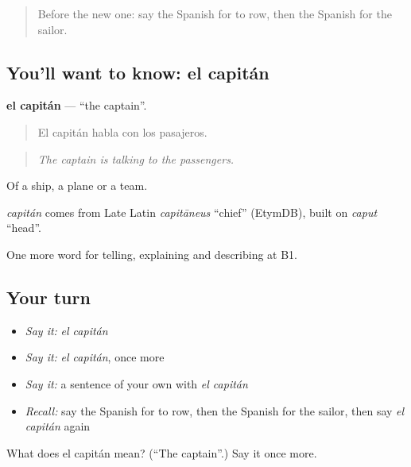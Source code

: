\label{lesson:ES-C659-capitan}



\begin{quote}
Before the new one: say the Spanish for to row, then the Spanish for the sailor.
\end{quote}

\subsection*{You'll want to know: el capitán}
\textbf{el capitán} — \textquotedblleft{}the captain\textquotedblright{}.

\begin{quote}
El capitán habla con los pasajeros.
\end{quote}

\begin{quote}
\emph{The captain is talking to the passengers.}
\end{quote}

Of a ship, a plane or a team.

\begin{cousinweb}
\emph{capitán} comes from Late Latin \emph{capitāneus} \textquotedblleft{}chief\textquotedblright{} (EtymDB), built on \emph{caput} \textquotedblleft{}head\textquotedblright{}.
\end{cousinweb}

\begin{grammarlens}[title={What you've built}]
One more word for telling, explaining and describing at B1.
\end{grammarlens}

\subsection*{Your turn}
\begin{itemize}
\raggedright
  \item \emph{Say it:} \emph{el capitán}
  \item \emph{Say it:} \emph{el capitán}, once more
  \item \emph{Say it:} a sentence of your own with \emph{el capitán}
  \item \emph{Recall:} say the Spanish for to row, then the Spanish for the sailor, then say \emph{el capitán} again
\end{itemize}

\begin{tcolorbox}[breakable,colback=teal!4,colframe=teal!35!black,title={Before you move on}]
What does el capitán mean? (\textquotedblleft{}The captain\textquotedblright{}.) Say it once more.
\end{tcolorbox}
